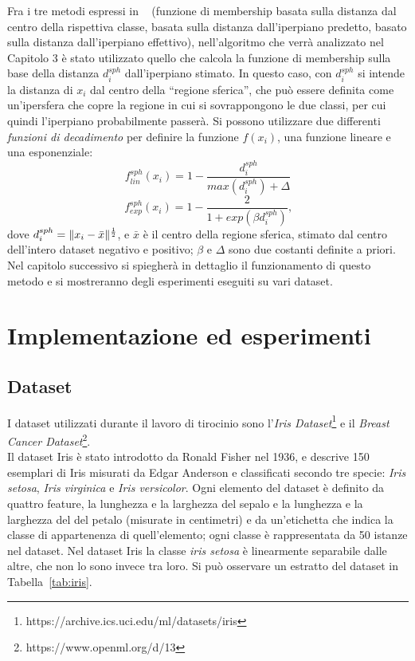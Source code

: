 \documentclass[oneside, openany]{book}
\DeclarePairedDelimiter{\norma}{\lVert}{\rVert}
\begin{document}
	Fra i tre metodi espressi in ~\cite{bib:cil} (funzione di membership basata sulla distanza dal centro della rispettiva classe, basata sulla distanza dall'iperpiano predetto, basato sulla distanza dall'iperpiano effettivo), nell'algoritmo che verrà analizzato nel Capitolo 3 è stato utilizzato quello che calcola la funzione di membership sulla base della distanza $d_i^{sph}$ dall'iperpiano stimato. In questo caso, con $d_i^{sph}$ si intende la distanza di $x_i$ dal centro della ``regione sferica'', che può essere definita come un'ipersfera che copre la regione in cui si sovrappongono le due classi, per cui quindi l'iperpiano probabilmente passerà. Si possono utilizzare due differenti \textit{funzioni di decadimento} per definire la funzione $f(x_i)$, una funzione lineare e una esponenziale:
	\[
		f_{lin}	^{sph}(x_i) = 1 - \frac{d_i^{sph}}{max(d_i^{sph})+\Delta} 
	\]
	\[
		f_{exp}	^{sph}(x_i) = 1 - \frac{2}{1+exp(\beta d_i^{sph})}\text{,}
	\]
	dove $d_i^{sph}=\norma{x_i-\bar{x}}^{\frac{1}{2}}$, e $\bar{x}$ è il centro della regione sferica, stimato dal centro dell'intero dataset negativo e positivo; $\beta$ e $\Delta$ sono due costanti definite a priori. Nel capitolo successivo si spiegherà in dettaglio il funzionamento di questo metodo e si mostreranno degli esperimenti eseguiti su vari dataset.	

	\chapter{Implementazione ed esperimenti}
	\label{chap:3}
	\section{Dataset}
	I dataset utilizzati durante il lavoro di tirocinio sono l'\textit{Iris Dataset}\footnote{https://archive.ics.uci.edu/ml/datasets/iris} e il \textit{Breast Cancer Dataset}\footnote{https://www.openml.org/d/13}.\\
	Il dataset Iris è stato introdotto da Ronald Fisher nel 1936, e descrive 150 esemplari di Iris misurati da Edgar Anderson e classificati secondo tre specie: \textit{Iris setosa}, \textit{Iris virginica} e \textit{Iris versicolor}. Ogni elemento del dataset è definito da quattro feature, la lunghezza e la larghezza del sepalo e la lunghezza e la larghezza del del petalo (misurate in centimetri) e da un'etichetta che indica la classe di appartenenza di quell'elemento; ogni classe è rappresentata da 50 istanze nel dataset. Nel dataset Iris la classe \textit{iris setosa} è linearmente separabile dalle altre, che non lo sono invece tra loro. Si può osservare un estratto del dataset in Tabella~\ref{tab:iris}.
	
\end{document}
